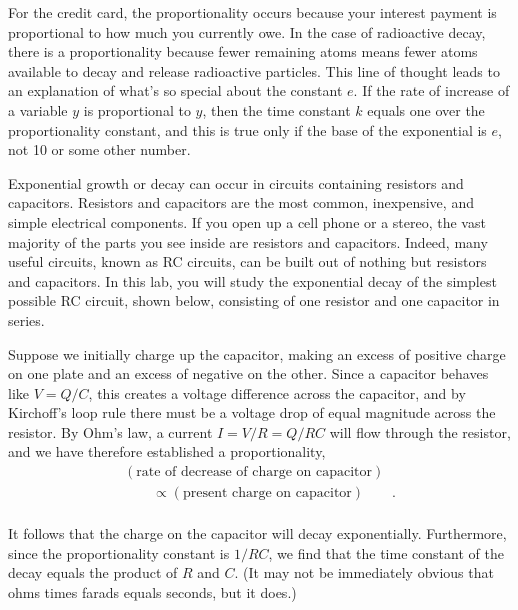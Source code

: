 For the credit card, the proportionality occurs because your
interest payment is proportional to how much you currently
owe. In the case of radioactive decay, there is a proportionality
because fewer remaining atoms means fewer atoms available to
decay and release radioactive particles. This line of thought
leads to an explanation of what's so special about the
constant $e$. If the rate of increase of a variable $y$ is
proportional to $y$, then the time constant $k$ equals one
over the proportionality constant, and this is true only if
the base of the exponential is $e$, not 10 or some other number.

Exponential growth or decay can occur in circuits containing
resistors and capacitors. Resistors and capacitors are the
most common, inexpensive, and simple electrical components.
If you open up a cell phone or a stereo, the vast majority
of the parts you see inside are resistors and capacitors.
Indeed, many useful circuits, known as RC circuits, can be
built out of nothing but resistors and capacitors. In this
lab, you will study the exponential decay of the simplest
possible RC circuit, shown below, consisting of one resistor
and one capacitor in series.


Suppose we initially charge up the capacitor, making an
excess of positive charge on one plate and an excess of
negative on the other. Since a capacitor behaves like
$V=Q/C$, this creates a voltage difference across the
capacitor, and by Kirchoff's loop rule there must be a
voltage drop of equal magnitude across the resistor. By
Ohm's law, a current $I=V/R=Q/RC$ will flow through
the resistor, and we have therefore established a proportionality,
\begin{gather*}
    (\text{rate of decrease of charge on capacitor}) \\
    \qquad	\propto(\text{present charge on capacitor})  \qquad .  \\
\end{gather*}

It follows that the charge on the capacitor will decay
exponentially. Furthermore, since the proportionality
constant is $1/RC$, we find that the time constant of the
decay equals the product of $R$ and $C$. (It may not be
immediately obvious that ohms times farads equals seconds, but it does.)

